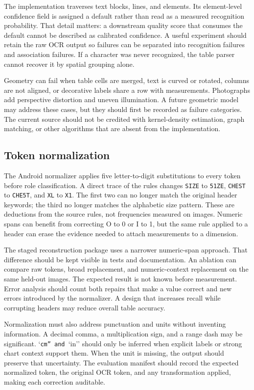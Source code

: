 \documentclass[10pt,letterpaper]{article}
\begin{document}
The implementation traverses text blocks, lines, and elements. Its element-level confidence field is assigned a default rather than read as a measured recognition probability. That detail matters: a downstream quality score that consumes the default cannot be described as calibrated confidence. A useful experiment should retain the raw OCR output so failures can be separated into recognition failures and association failures. If a character was never recognized, the table parser cannot recover it by spatial grouping alone.

Geometry can fail when table cells are merged, text is curved or rotated, columns are not aligned, or decorative labels share a row with measurements. Photographs add perspective distortion and uneven illumination. A future geometric model may address these cases, but they should first be recorded as failure categories. The current source should not be credited with kernel-density estimation, graph matching, or other algorithms that are absent from the implementation.

\subsection{Token normalization}

The Android normalizer applies five letter-to-digit substitutions to every token before role classification. A direct trace of the rules changes \texttt{SIZE} to \texttt{51ZE}, \texttt{CHEST} to \texttt{CHE5T}, and \texttt{XL} to \texttt{X1}. The first two can no longer match the original header keywords; the third no longer matches the alphabetic size pattern. These are deductions from the source rules, not frequencies measured on images. Numeric spans can benefit from correcting O to 0 or I to 1, but the same rule applied to a header can erase the evidence needed to attach measurements to a dimension.

The staged reconstruction package uses a narrower numeric-span approach. That difference should be kept visible in tests and documentation. An ablation can compare raw tokens, broad replacement, and numeric-context replacement on the same held-out images. The expected result is not known before measurement. Error analysis should count both repairs that make a value correct and new errors introduced by the normalizer. A design that increases recall while corrupting headers may reduce overall table accuracy.

Normalization must also address punctuation and units without inventing information. A decimal comma, a multiplication sign, and a range dash may be significant. `\texttt{cm'' and }`in'' should only be inferred when explicit labels or strong chart context support them. When the unit is missing, the output should preserve that uncertainty. The evaluation manifest should record the expected normalized token, the original OCR token, and any transformation applied, making each correction auditable.
\end{document}
